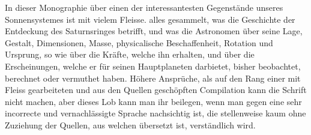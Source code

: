 In dieser Monographie über einen der interessantesten Gegenstände unseres Sonnensystemes ist mit vielem Fleisse. alles gesammelt, was die Geschichte der Entdeckung des Saturnsringes betrifft, und was die Astronomen über seine Lage, Gestalt, Dimensionen, \textperiodcentered{}Masse, physicalische Beschaffenheit, Rotation und Ursprung, so wie über die Kräfte, welche ihn erhalten, und über die Erscheinungen, welche er für seinen Hauptplaneten darbietet, bisher beobachtet, berechnet oder vermuthet haben. Höhere Ansprüche, als auf den Rang einer mit Fleiss gearbeiteten und aus den Quellen geschöpften Compilation kann die Schrift nicht machen, aber dieses Lob kann man ihr beilegen, wenn man gegen eine sehr incorrecte und vernachlässigte Sprache nachsichtig ist, die stellenweise kaum ohne Zuziehung der Quellen, aus welchen übersetzt ist, verständlich wird.
